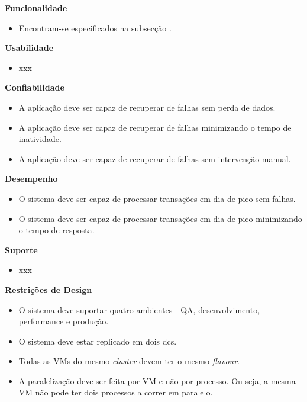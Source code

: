 \vspace{5mm}

\textbf{Funcionalidade}
\begin{itemize}
  \item Encontram-se especificados na subsecção .
\end{itemize}

\textbf{Usabilidade}
\begin{itemize}
  \item xxx
\end{itemize}

\textbf{Confiabilidade}
\begin{itemize}
  \item A aplicação deve ser capaz de recuperar de falhas sem perda de dados.
  \item A aplicação deve ser capaz de recuperar de falhas minimizando o tempo de inatividade.
  \item A aplicação deve ser capaz de recuperar de falhas sem intervenção manual.
\end{itemize}

\textbf{Desempenho}
\begin{itemize}
  \item O sistema deve ser capaz de processar transações em dia de pico sem falhas.
  \item O sistema deve ser capaz de processar transações em dia de pico minimizando o tempo de resposta.
\end{itemize}

\textbf{Suporte}
\begin{itemize}
  \item xxx
\end{itemize}

\textbf{Restrições de Design}
\begin{itemize}
  \item O sistema deve suportar quatro ambientes - \ac{QA}, desenvolvimento, 
    performance e produção.
  \item O sistema deve estar replicado em dois \glspl{dc}.
  \item Todas as \acp{VM} do mesmo \textit{\gls{cluster}} devem ter o mesmo \textit{\gls{flavour}}.
  \item A paralelização deve ser feita por \ac{VM} e não por processo. Ou seja, a mesma \ac{VM} 
    não pode ter dois processos a correr em paralelo.
\end{itemize}

